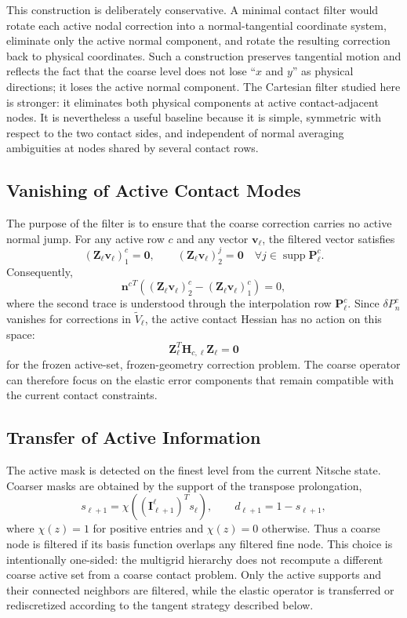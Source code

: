 \documentclass[11pt]{article}
\newcommand{\vv}{\boldsymbol{v}}
\newcommand{\HH}{\boldsymbol{H}}
\newcommand{\II}{\boldsymbol{I}}
\newcommand{\ZZ}{\boldsymbol{Z}}
\newcommand{\PP}{\boldsymbol{P}}
\newcommand{\nn}{\boldsymbol{n}}
\newcommand{\supp}{\operatorname{supp}}
\begin{document}
This construction is deliberately conservative.  A minimal contact filter
would rotate each active nodal correction into a normal-tangential coordinate
system, eliminate only the active normal component, and rotate the resulting
correction back to physical coordinates.  Such a construction preserves
tangential motion and reflects the fact that the coarse level does not lose
``$x$ and $y$'' as physical directions; it loses the active normal component.
The Cartesian filter studied here is stronger: it eliminates both physical
components at active contact-adjacent nodes.  It is nevertheless a useful
baseline because it is simple, symmetric with respect to the two contact
sides, and independent of normal averaging ambiguities at nodes shared by
several contact rows.

\subsection{Vanishing of Active Contact Modes}

The purpose of the filter is to ensure that the coarse correction carries no
active normal jump.  For any active row $c$ and any vector $\vv_\ell$, the
filtered vector satisfies
\[
    (\ZZ_\ell\vv_\ell)_1^c=\boldsymbol{0},
    \qquad
    (\ZZ_\ell\vv_\ell)_2^j=\boldsymbol{0}
    \quad \forall j\in\supp\PP_\ell^c .
\]
Consequently,
\[
    {\nn^c}^{T}
    \left(
        (\ZZ_\ell\vv_\ell)_2^c
        -
        (\ZZ_\ell\vv_\ell)_1^c
    \right)
    =
    0,
\]
where the second trace is understood through the interpolation row
$\PP_\ell^c$.  Since $\delta P_n^c$ vanishes for corrections in
$\widetilde V_\ell$, the active contact Hessian has no action on this space:
\[
    \ZZ_\ell^T\HH_{c,\ell}\ZZ_\ell=\boldsymbol{0}
\]
for the frozen active-set, frozen-geometry correction problem.  The coarse
operator can therefore focus on the elastic error components that remain
compatible with the current contact constraints.

\subsection{Transfer of Active Information}

The active mask is detected on the finest level from the current Nitsche
state.  Coarser masks are obtained by the support of the transpose
prolongation,
\[
    s_{\ell+1}
    =
    \chi\!\left((\II_{\ell+1}^{\ell})^T s_\ell\right),
    \qquad
    d_{\ell+1}=1-s_{\ell+1},
\]
where $\chi(z)=1$ for positive entries and $\chi(z)=0$ otherwise.  Thus a
coarse node is filtered if its basis function overlaps any filtered fine
node.  This choice is intentionally one-sided: the multigrid hierarchy does
not recompute a different coarse active set from a coarse contact problem.
Only the active supports and their connected neighbors are filtered, while the
elastic operator is transferred or rediscretized according to the tangent
strategy described below.
\end{document}
